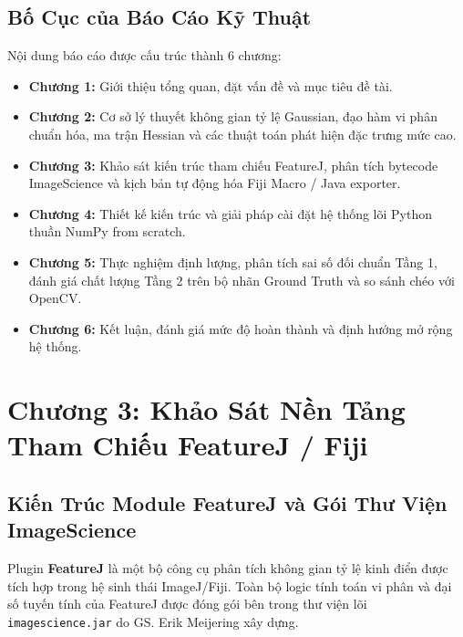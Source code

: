 \documentclass[conference]{IEEEtran}
\begin{document}
\subsection{Bố Cục của Báo Cáo Kỹ Thuật}
Nội dung báo cáo được cấu trúc thành 6 chương:
\begin{itemize}
    \item \textbf{Chương 1:} Giới thiệu tổng quan, đặt vấn đề và mục tiêu đề tài.
    \item \textbf{Chương 2:} Cơ sở lý thuyết không gian tỷ lệ Gaussian, đạo hàm vi phân chuẩn hóa, ma trận Hessian và các thuật toán phát hiện đặc trưng mức cao.
    \item \textbf{Chương 3:} Khảo sát kiến trúc tham chiếu FeatureJ, phân tích bytecode ImageScience và kịch bản tự động hóa Fiji Macro / Java exporter.
    \item \textbf{Chương 4:} Thiết kế kiến trúc và giải pháp cài đặt hệ thống lõi Python thuần NumPy from scratch.
    \item \textbf{Chương 5:} Thực nghiệm định lượng, phân tích sai số đối chuẩn Tầng 1, đánh giá chất lượng Tầng 2 trên bộ nhãn Ground Truth và so sánh chéo với OpenCV.
    \item \textbf{Chương 6:} Kết luận, đánh giá mức độ hoàn thành và định hướng mở rộng hệ thống.
\end{itemize}



\section{Chương 3: Khảo Sát Nền Tảng Tham Chiếu FeatureJ / Fiji}

\subsection{Kiến Trúc Module FeatureJ và Gói Thư Viện ImageScience}
Plugin \textbf{FeatureJ} là một bộ công cụ phân tích không gian tỷ lệ kinh điển được tích hợp trong hệ sinh thái ImageJ/Fiji. Toàn bộ logic tính toán vi phân và đại số tuyến tính của FeatureJ được đóng gói bên trong thư viện lõi \texttt{imagescience.jar} do GS. Erik Meijering xây dựng. 
\end{document}

